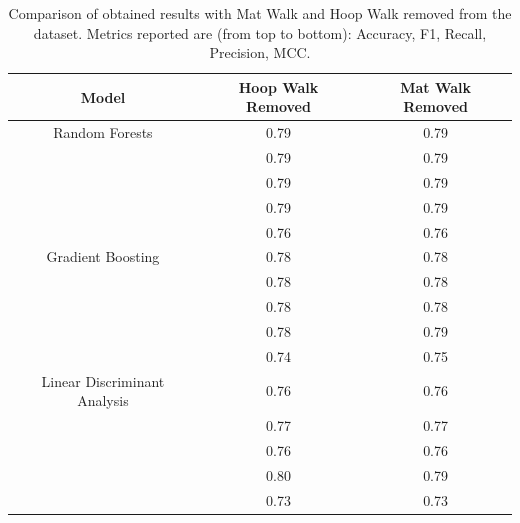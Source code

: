                 \begin{table}[htbp]
                    \centering
                    \begin{tabular}{|c|c|c|}
                    \hline
                    \textbf{Model} & \textbf{Hoop Walk Removed} & \textbf{Mat Walk Removed} \\ \hline
                        Random Forests                   & 0.79 & 0.79 \\ 
                                                        & 0.79 & 0.79 \\ 
                                                        & 0.79 & 0.79 \\ 
                                                        & 0.79 & 0.79 \\
                                                        & 0.76 & 0.76 \\ 
                                                        \hline
                        Gradient Boosting               & 0.78 & 0.78 \\ 
                                                        & 0.78 & 0.78 \\ 
                                                        & 0.78 & 0.78 \\ 
                                                        & 0.78 & 0.79 \\
                                                        & 0.74 & 0.75 \\
                                                        \hline
                        Linear Discriminant Analysis    & 0.76 & 0.76 \\ 
                                                        & 0.77 & 0.77 \\ 
                                                        & 0.76 & 0.76 \\
                                                        & 0.80 & 0.79 \\ 
                                                        & 0.73 & 0.73 \\ 
                                                        \hline
                    \end{tabular}
                    \caption{Comparison of obtained results with Mat Walk and Hoop Walk removed from the dataset. Metrics reported are (from top to bottom): Accuracy, F1, Recall, Precision, MCC.}
                    \label{tab:correct_approach_mat_hoop} 
                \end{table}
           \newpage 

